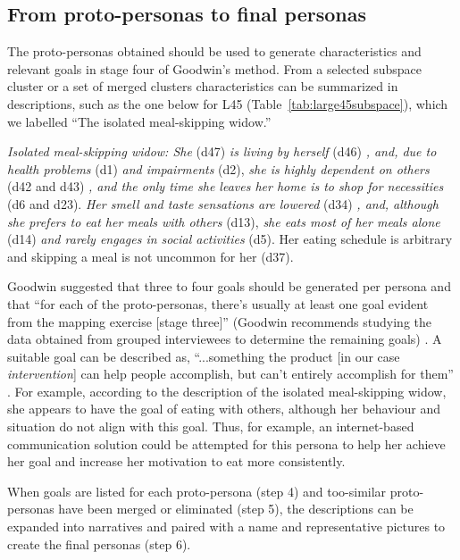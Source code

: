 \subsection{From proto-personas to final personas}

The proto-personas obtained should be used to generate characteristics and relevant goals in stage four of Goodwin's method. From a selected subspace cluster or a set of merged clusters characteristics can be summarized in descriptions, such as the one below for L45 (Table~\ref{tab:large45subspace}), which we labelled ``The isolated meal-skipping widow.'' 

\textit{Isolated meal-skipping widow: She} (d47) \textit{is living by herself} (d46) \textit{, and, due to health problems} (d1) \textit{and impairments} (d2), \textit{she is highly dependent on others} (d42 and d43) \textit{, and the only time she leaves her home is to shop for necessities} (d6 and d23). \textit{Her smell and taste sensations are lowered} (d34) \textit{, and, although she prefers to eat her meals with others} (d13), \textit{she eats most of her meals alone} (d14) \textit{and rarely engages in social activities} (d5). {Her eating schedule is arbitrary and skipping a meal is not uncommon for her} (d37).

Goodwin suggested that three to four goals should be generated per persona and that ``for each of the proto-personas, there's usually at least one goal evident from the mapping exercise [stage three]'' (Goodwin recommends studying the data obtained from grouped interviewees to determine the remaining goals) \citep{Goodwin2009}. A suitable goal can be described as, ``...something the product [in our case \textit{intervention}] can help people accomplish, but can't entirely accomplish for them'' \citep{Goodwin2009}. For example, according to the description of the isolated meal-skipping widow, she appears to have the goal of eating with others, although her behaviour and situation do not align with this goal. Thus, for example, an internet-based communication solution could be attempted for this persona to help her achieve her goal and increase her motivation to eat more consistently.

When goals are listed for each proto-persona (step 4) and too-similar proto-personas have been merged or eliminated (step 5), the descriptions can be expanded into narratives and paired with a name and representative pictures to create the final personas (step 6).

